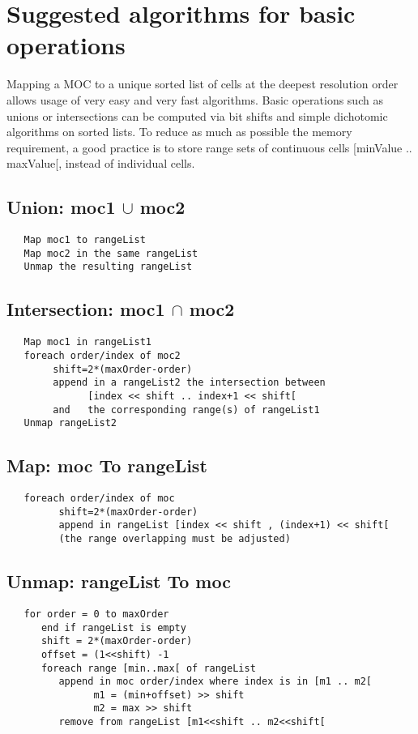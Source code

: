 \section{Suggested algorithms for basic operations}
Mapping a MOC to a unique sorted list of cells at the deepest
resolution order allows usage of very easy and very fast
algorithms. Basic operations such as unions or intersections can be
computed via bit shifts and simple dichotomic algorithms on sorted
lists.  To reduce as much as possible the memory requirement, a good
practice is to store range sets of continuous cells [minValue
  .. maxValue[, instead of individual cells.

\subsection{Union: moc1 $\cup$ moc2}
\begin{verbatim}
   Map moc1 to rangeList
   Map moc2 in the same rangeList
   Unmap the resulting rangeList
\end{verbatim}

\subsection{Intersection: moc1 $\cap$ moc2}
\begin{verbatim}
   Map moc1 in rangeList1
   foreach order/index of moc2
        shift=2*(maxOrder-order)
        append in a rangeList2 the intersection between
              [index << shift .. index+1 << shift[
        and   the corresponding range(s) of rangeList1
   Unmap rangeList2
\end{verbatim}

\subsection{Map: moc To rangeList}
\begin{verbatim}
   foreach order/index of moc
         shift=2*(maxOrder-order)
         append in rangeList [index << shift , (index+1) << shift[
         (the range overlapping must be adjusted)
\end{verbatim}

\subsection{Unmap: rangeList To moc}
\begin{verbatim}
   for order = 0 to maxOrder
      end if rangeList is empty
      shift = 2*(maxOrder-order)
      offset = (1<<shift) -1
      foreach range [min..max[ of rangeList
         append in moc order/index where index is in [m1 .. m2[
               m1 = (min+offset) >> shift
               m2 = max >> shift
         remove from rangeList [m1<<shift .. m2<<shift[
\end{verbatim}

